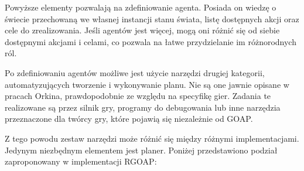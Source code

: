 Powyższe elementy pozwalają na zdefiniowanie agenta. Posiada on wiedzę o świecie przechowaną we własnej instancji stanu świata, listę dostępnych akcji oraz cele do zrealizowania. Jeśli agentów jest więcej, mogą oni różnić się od siebie dostępnymi akcjami i celami, co pozwala na łatwe przydzielanie im różnorodnych ról. 

Po zdefiniowaniu agentów możliwe jest użycie narzędzi drugiej kategorii, automatyzujących tworzenie i wykonywanie planu. Nie są one jawnie opisane w pracach Orkina, prawdopodobnie ze względu na specyfikę gier. Zadania te realizowane są przez silnik gry, programy do debugowania lub inne narzędzia przeznaczone dla twórcy gry, które pojawią się niezależnie od GOAP. 

Z tego powodu zestaw narzędzi może różnić się między różnymi implementacjami. Jedynym niezbędnym elementem jest planer. Poniżej przedstawiono podział zaproponowany w implementacji RGOAP:~\cite{KOLB, KOLBrgoap}


